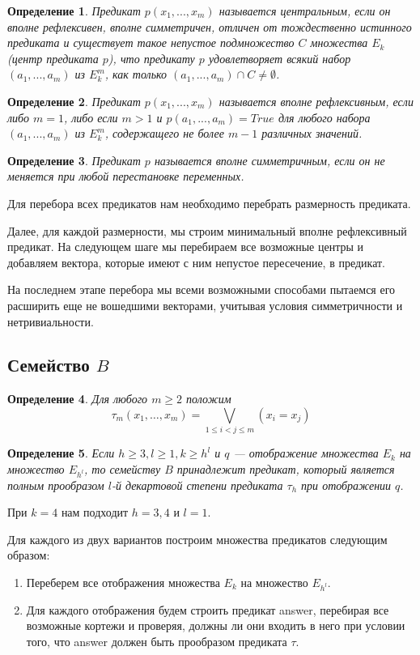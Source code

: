 \documentclass[a4paper,14pt]{extreport}
\newtheorem{opr}{Определение}
\begin{document}
\begin{opr} Предикат $p(x_1,...,x_m )$ называется центральным, если он вполне рефлексивен, вполне симметричен, отличен от тождественно истинного предиката и существует такое непустое подмножество $C$ множества $E_k$ (центр предиката $p$),  что предикату $p$ удовлетворяет всякий набор $(a_1,..., a_m)$ из $E_k^m$, как только $(a_1,..., a_m) \cap C \neq \emptyset$.
\end{opr}
\begin{opr}Предикат $p(x_1,..., x_m)$ называется вполне рефлексивным, если либо $m = 1$, либо  если $m > 1$ и $p(a_1,..., a_m) = True$ для любого набора $(a_1,...,a_m)$ из $E_k^m$, содержащего не более $m-1$ различных значений.
\end{opr}
\begin{opr} 
Предикат $p$ называется вполне симметричным, если он не меняется при любой перестановке переменных.  
\end{opr}

Для перебора всех предикатов нам необходимо перебрать размерность предиката.

Далее, для каждой размерности, мы строим минимальный вполне рефлексивный предикат.
На следующем шаге мы перебираем все возможные центры и добавляем вектора, которые имеют с ним непустое пересечение, в предикат.

На последнем этапе перебора мы  всеми возможными способами пытаемся его расширить еще не вошедшими векторами, учитывая условия симметричности и нетривиальности.

\subsection{Семейство $B$}
\begin{opr}
Для любого $m \geqslant 2$ положим
$$ \tau_m(x_1, \ldots, x_m) = \bigvee_{1\leqslant i < j \leqslant m}(x_i=x_j) $$
\end{opr}
\begin{opr}
Если $h \geqslant 3, l \geqslant 1, k \geqslant h^l$ и $q$ — отображение множества $E_k$ на  множество $E_{h^l}$, то семейству $B$ принадлежит предикат, который является полным прообразом $l$-й декартовой степени предиката $\tau_h$ при отображении $q$.
\end{opr}
При $k=4$ нам подходит $h=3,4$ и $l=1$.

Для каждого из двух вариантов построим множества предикатов следующим образом:
\begin{enumerate}
\item Переберем все отображения множества $E_k$ на  множество $E_{h^l}$.
\item Для каждого отображения будем строить предикат answer, перебирая все возможные кортежи и проверяя, должны ли они входить в него при условии того, что answer должен быть прообразом предиката $\tau$.
\end{enumerate} 
\end{document}
